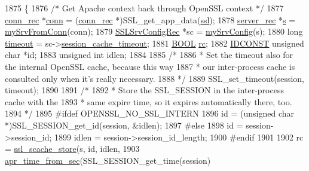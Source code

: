 \begin{DoxyCode}
1875 \{
1876     \textcolor{comment}{/* Get Apache context back through OpenSSL context */}
1877     \hyperlink{structconn__rec}{conn\_rec} *\hyperlink{group__MOD__PROXY_gaaf2a99e7e3709d3e41bf0a33f1004b4e}{conn}      = (\hyperlink{structconn__rec}{conn\_rec} *)SSL\_get\_app\_data(\hyperlink{group__MOD__SSL_ga91d808d6c1c01029f9c9260b9b69a437}{ssl});
1878     \hyperlink{structserver__rec}{server\_rec} *\hyperlink{group__APACHE__CORE__LISTEN_ga9359ed159c8b295541e3770172d34550}{s}       = \hyperlink{group__MOD__SSL__PRIVATE_ga20a45d64a09acadc21debea6057f62a8}{mySrvFromConn}(conn);
1879     \hyperlink{structSSLSrvConfigRec}{SSLSrvConfigRec} *sc = \hyperlink{group__MOD__SSL__PRIVATE_ga3ea8e2c288a4f4af189ae0fc4f1fd996}{mySrvConfig}(s);
1880     \textcolor{keywordtype}{long} \hyperlink{group__APACHE__CORE__DAEMON_ga48b7aa88e5841c0fe69f7d9a88646af3}{timeout}        = sc->\hyperlink{structSSLSrvConfigRec_ad2ddc7bf93ec43915b0c05d28a9ff6b7}{session\_cache\_timeout};
1881     \hyperlink{pcre__internal_8h_a050c65e107f0c828f856a231f4b4e788}{BOOL} \hyperlink{group__APACHE__CORE__CONFIG_ga2e051c0ce9ee165170cd7973f2464512}{rc};
1882     \hyperlink{group__MOD__SSL__PRIVATE_ga7b2aaacd57801ee8b4692b1699a1b1bd}{IDCONST} \textcolor{keywordtype}{unsigned} \textcolor{keywordtype}{char} *id;
1883     \textcolor{keywordtype}{unsigned} \textcolor{keywordtype}{int} idlen;
1884 
1885     \textcolor{comment}{/*}
1886 \textcolor{comment}{     * Set the timeout also for the internal OpenSSL cache, because this way}
1887 \textcolor{comment}{     * our inter-process cache is consulted only when it's really necessary.}
1888 \textcolor{comment}{     */}
1889     SSL\_set\_timeout(session, timeout);
1890 
1891     \textcolor{comment}{/*}
1892 \textcolor{comment}{     * Store the SSL\_SESSION in the inter-process cache with the}
1893 \textcolor{comment}{     * same expire time, so it expires automatically there, too.}
1894 \textcolor{comment}{     */}
1895 \textcolor{preprocessor}{#ifdef OPENSSL\_NO\_SSL\_INTERN}
1896     \textcolor{keywordtype}{id} = (\textcolor{keywordtype}{unsigned} \textcolor{keywordtype}{char} *)SSL\_SESSION\_get\_id(session, &idlen);
1897 \textcolor{preprocessor}{#else}
1898     \textcolor{keywordtype}{id} = session->session\_id;
1899     idlen = session->session\_id\_length;
1900 \textcolor{preprocessor}{#endif}
1901 
1902     rc = \hyperlink{group__MOD__SSL__PRIVATE_ga2f1dd17002a51792871646382b10f72d}{ssl\_scache\_store}(s, \textcolor{keywordtype}{id}, idlen,
1903                           \hyperlink{group__apr__time_gaec56c2c03299a750006bfcc08d64ec32}{apr\_time\_from\_sec}(SSL\_SESSION\_get\_time(session)

\end{DoxyCode}
